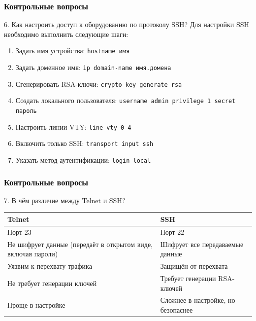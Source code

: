 \begin{frame}
\frametitle{Контрольные вопросы}
\begin{block}{6. Как настроить доступ к оборудованию по протоколу SSH?}
Для настройки SSH необходимо выполнить следующие шаги:
\begin{enumerate}
    \item Задать имя устройства: \texttt{hostname имя}
    \item Задать доменное имя: \texttt{ip domain-name имя.домена}
    \item Сгенерировать RSA-ключи: \texttt{crypto key generate rsa}
    \item Создать локального пользователя: \texttt{username admin privilege 1 secret пароль}
    \item Настроить линии VTY: \texttt{line vty 0 4}
    \item Включить только SSH: \texttt{transport input ssh}
    \item Указать метод аутентификации: \texttt{login local}
\end{enumerate}
\end{block}
\end{frame}

\begin{frame}
\frametitle{Контрольные вопросы}
\begin{block}{7. В чём различие между Telnet и SSH?}
\begin{table}[h]
\centering
\begin{tabular}{|p{3cm}|p{5cm}|}
\hline
\textbf{Telnet} & \textbf{SSH} \\
\hline
Порт 23 & Порт 22 \\
\hline
Не шифрует данные (передаёт в открытом виде, включая пароли) & Шифрует все передаваемые данные \\
\hline
Уязвим к перехвату трафика & Защищён от перехвата \\
\hline
Не требует генерации ключей & Требует генерации RSA-ключей \\
\hline
Проще в настройке & Сложнее в настройке, но безопаснее \\
\hline
\end{tabular}
\end{table}
\end{block}
\end{frame}

